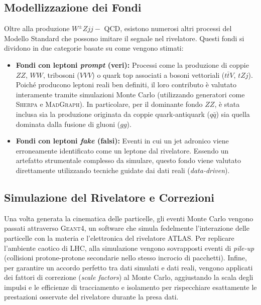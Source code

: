 \documentclass[11pt]{article}
\newcommand{\wzjjqcd}{$W^\pm Z jj-$ QCD}
\begin{document}
\subsection{Modellizzazione dei Fondi}
Oltre alla produzione \wzjjqcd, esistono numerosi altri processi del Modello Standard che possono imitare il segnale nel rivelatore. Questi fondi si dividono in due categorie basate su come vengono stimati:
\begin{itemize}
    \item \textbf{Fondi con leptoni \textit{prompt} (veri):} Processi come la produzione di coppie $ZZ$, $WW$, tribosoni ($VVV$) o quark top associati a bosoni vettoriali ($t\bar{t}V$, $tZj$). Poiché producono leptoni reali ben definiti, il loro contributo è valutato interamente tramite simulazioni Monte Carlo (utilizzando generatori come \textsc{Sherpa} e \textsc{MadGraph}). In particolare, per il dominante fondo $ZZ$, è stata inclusa sia la produzione originata da coppie quark-antiquark ($q\bar{q}$) sia quella dominata dalla fusione di gluoni ($gg$).
    \item \textbf{Fondi con leptoni \textit{fake} (falsi):} Eventi in cui un jet adronico viene erroneamente identificato come un leptone dal rivelatore. Essendo un artefatto strumentale complesso da simulare, questo fondo viene valutato direttamente utilizzando tecniche guidate dai dati reali (\textit{data-driven}).
\end{itemize}

\subsection{Simulazione del Rivelatore e Correzioni}
Una volta generata la cinematica delle particelle, gli eventi Monte Carlo vengono passati attraverso \textsc{Geant4}, un software che simula fedelmente l'interazione delle particelle con la materia e l'elettronica del rivelatore ATLAS. 
Per replicare l'ambiente caotico di LHC, alla simulazione vengono sovrapposti eventi di \textit{pile-up} (collisioni protone-protone secondarie nello stesso incrocio di pacchetti). Infine, per garantire un accordo perfetto tra dati simulati e dati reali, vengono applicati dei fattori di correzione (\textit{scale factors}) al Monte Carlo, aggiustando la scala degli impulsi e le efficienze di tracciamento e isolamento per rispecchiare esattamente le prestazioni osservate del rivelatore durante la presa dati.
\end{document}
